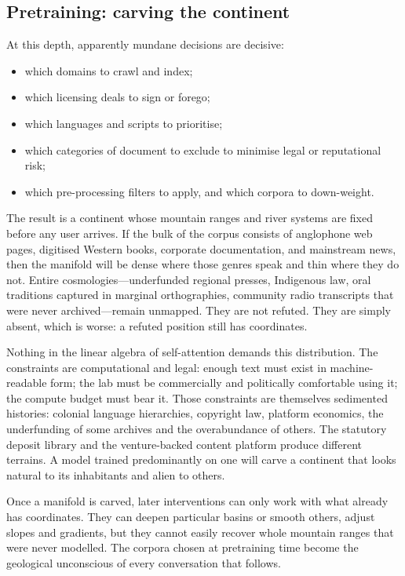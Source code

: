 \subsection{Pretraining: carving the continent}

At this depth, apparently mundane decisions are decisive:

\begin{itemize}
  \item which domains to crawl and index;
  \item which licensing deals to sign or forego;
  \item which languages and scripts to prioritise;
  \item which categories of document to exclude to minimise legal or reputational risk;
  \item which pre-processing filters to apply, and which corpora to down-weight.
\end{itemize}

The result is a continent whose mountain ranges and river systems are fixed before any user arrives. If the bulk of the corpus consists of anglophone web pages, digitised Western books, corporate documentation, and mainstream news, then the manifold will be dense where those genres speak and thin where they do not. Entire cosmologies---underfunded regional presses, Indigenous law, oral traditions captured in marginal orthographies, community radio transcripts that were never archived---remain unmapped. They are not refuted. They are simply absent, which is worse: a refuted position still has coordinates.

Nothing in the linear algebra of self-attention demands this distribution. The constraints are computational and legal: enough text must exist in machine-readable form; the lab must be commercially and politically comfortable using it; the compute budget must bear it. Those constraints are themselves sedimented histories: colonial language hierarchies, copyright law, platform economics, the underfunding of some archives and the overabundance of others. The statutory deposit library and the venture-backed content platform produce different terrains. A model trained predominantly on one will carve a continent that looks natural to its inhabitants and alien to others.

Once a manifold is carved, later interventions can only work with what already has coordinates. They can deepen particular basins or smooth others, adjust slopes and gradients, but they cannot easily recover whole mountain ranges that were never modelled. The corpora chosen at pretraining time become the geological unconscious of every conversation that follows.

